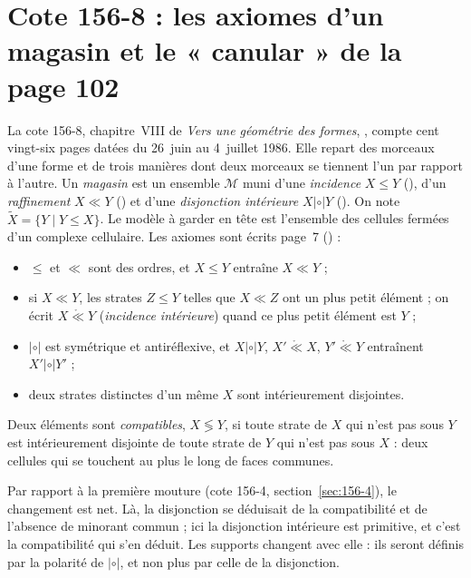 \section[Cote 156-8 : les axiomes d'un magasin et le « canular » de la page 102]{Cote 156-8 : les axiomes d'un magasin et le « canular » de la page 102\protect{}}\label{sec:156-8}

La cote 156-8, chapitre~VIII de \emph{Vers une géométrie des formes}, , compte cent vingt-six pages datées du 26~juin au 4~juillet 1986. Elle repart des morceaux d'une forme et de trois manières dont deux morceaux se tiennent l'un par rapport à l'autre. Un \emph{magasin} est un ensemble $\mathcal M$ muni d'une \emph{incidence} $X \leq Y$ (), d'un \emph{raffinement} $X \ll Y$ () et d'une \emph{disjonction intérieure} $X \mathrel{|\circ|} Y$ (). On note $\widetilde X = \{Y \mid Y \leq X\}$. Le modèle à garder en tête est l'ensemble des cellules fermées d'un complexe cellulaire. Les axiomes sont écrits page~7 () :
\begin{itemize}
\item[Mag\,1] $\leq$ et $\ll$ sont des ordres, et $X \leq Y$ entraîne $X \ll Y$ ;
\item[Mag\,2] si $X \ll Y$, les strates $Z \leq Y$ telles que $X \ll Z$ ont un plus petit élément ; on écrit $X \mathrel{\mathring\ll} Y$ (\emph{incidence intérieure}) quand ce plus petit élément est $Y$ ;
\item[Mag\,3] $\mathrel{|\circ|}$ est symétrique et antiréflexive, et $X \mathrel{|\circ|} Y$, $X' \mathrel{\mathring\ll} X$, $Y' \mathrel{\mathring\ll} Y$ entraînent $X' \mathrel{|\circ|} Y'$ ;
\item[Mag\,4] deux strates distinctes d'un même $X$ sont intérieurement disjointes.
\end{itemize}
Deux éléments sont \emph{compatibles}, $X \lessgtr Y$, si toute strate de $X$ qui n'est pas sous $Y$ est intérieurement disjointe de toute strate de $Y$ qui n'est pas sous $X$ : deux cellules qui se touchent au plus le long de faces communes.

Par rapport à la première mouture (cote 156-4, section~\ref{sec:156-4}), le changement est net. Là, la disjonction se déduisait de la compatibilité et de l'absence de minorant commun ; ici la disjonction intérieure est primitive, et c'est la compatibilité qui s'en déduit. Les supports changent avec elle : ils seront définis par la polarité de $\mathrel{|\circ|}$, et non plus par celle de la disjonction.

